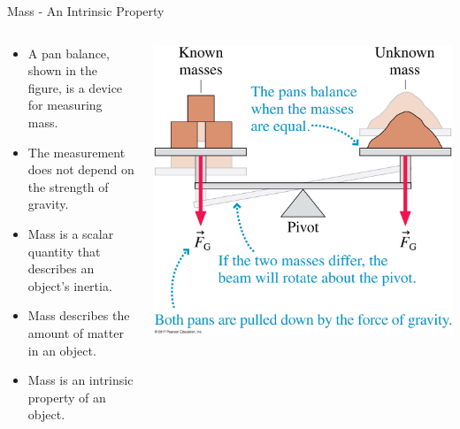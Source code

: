 \documentclass{beamer}
\begin{document}
\begin{frame}{Mass - An Intrinsic Property}
\begin{columns}
\begin{column}{0.5\textwidth}
\begin{itemize}
   \item A pan balance, shown in the figure, is a device for measuring mass.
   \item The measurement does not depend on the strength of gravity.
   \item Mass is a scalar quantity that describes an object's inertia.
   \item Mass describes the amount of matter in an object.
   \item Mass is an intrinsic property of an object.
\end{itemize}
\end{column}
\begin{column}{0.5\textwidth}
   \includegraphics[width=\textwidth]{../figures/06_05_Figure.jpg}
\end{column}
\end{columns}
\end{frame}
\end{document}
